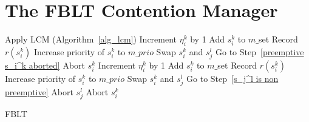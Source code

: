\section{The FBLT Contention Manager}\label{sec:fblt design}
%
\begin{algorithm}[!htpd]
\footnotesize{
\LinesNumbered
{}
{
%
Apply LCM (Algorithm~\ref{alg_lcm})\label{apply lcm}\;
%
{
{
Increment $\eta_i^k$ by 1\label{increment eta 1}\;
}
{
Add $s_i^k$ to $m\_$set\label{add to m_set 1}\;
Record $r(s_i^k)$\label{record 1}\;
Increase priority of $s_i^k$ to $m\_prio$\label{increase priority 1}\;
}
}
{
Swap $s_i^k$ and $s_j^l$\;
Go to Step~\ref{preemptive s_i^k aborted}\;
}
}
{
Abort $s_i^k$\;
{
Increment $\eta_i^k$ by 1\label{increment eta 2}\;
}
{
Add $s_i^k$ to $m\_$set\label{add to m_set 2}\;
Record $r(s_i^k)$\label{record 2}\;
Increase priority of $s_i^k$ to $m\_prio$\label{increase priority 2}\;
}
}
{
Swap $s_i^k$ and $s_j^l$\;
Go to Step~\ref{s_j^l is non preemptive}\label{end preemptive and non preemptive}\;
}
\Else
{
\label{both non preemptive}
{	
Abort $s_j^l$\label{s_i^k first in m_set}\;
}
{
Abort $s_i^k$\label{s_j^l first in m_set}\;
}
}
}
\caption{FBLT}\label{fblt-algorithm}
\end{algorithm}
%
